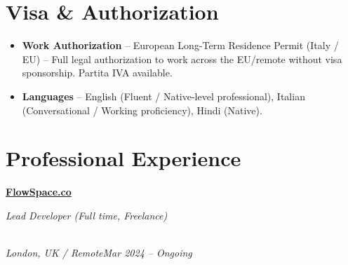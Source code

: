 \documentclass[a4paper,10pt]{article}
\newcommand{\role}[4]{\vspace{2pt}\noindent\hspace{0.6em}\parbox[t]{0.38\textwidth}{\raggedright\textbf{#1}}\hfill\parbox[t]{0.58\textwidth}{\raggedleft\textit{#2}}\\{\textit{#3}\hfill\textit{#4}}\vspace{1pt}}
\begin{document}
\section{Visa \& Authorization}
\begin{itemize}
\item \textbf{Work Authorization} -- European Long-Term Residence Permit (Italy / EU) -- Full legal authorization to work across the EU/remote without visa sponsorship. Partita IVA available.
\item \textbf{Languages} -- English (Fluent / Native-level professional), Italian (Conversational / Working proficiency), Hindi (Native).
\end{itemize}

\section{Professional Experience}
\role{\href{https://flowspace.co}{FlowSpace.co}}{Lead Developer (Full time, Freelance)}{London, UK / Remote}{Mar 2024 -- Ongoing}
\end{document}
